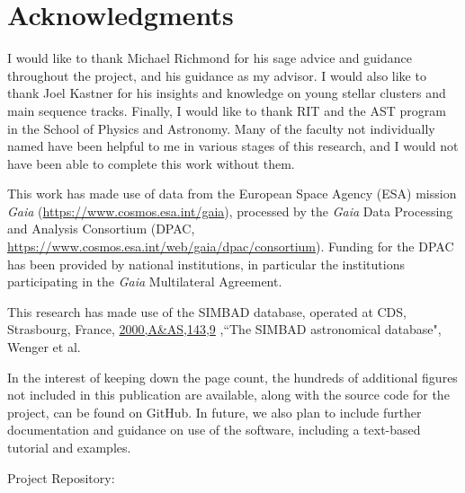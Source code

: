 \documentclass[onecolumn,table,xcdraw,super]{aastex631}
\begin{document}
\section{Acknowledgments}
I would like to thank Michael Richmond for his sage advice and guidance throughout the project, and his guidance as my advisor. I would also like to thank Joel Kastner for his insights and knowledge on young stellar clusters and main sequence tracks. Finally, I would like to thank RIT and the AST program in the School of Physics and Astronomy. Many of the faculty not individually named have been helpful to me in various stages of this research, and I would not have been able to complete this work without them.

This work has made use of data from the European Space Agency (ESA) mission
{\it Gaia} (\url{https://www.cosmos.esa.int/gaia}), processed by the {\it Gaia}
Data Processing and Analysis Consortium (DPAC,
\url{https://www.cosmos.esa.int/web/gaia/dpac/consortium}). Funding for the DPAC
has been provided by national institutions, in particular the institutions
participating in the {\it Gaia} Multilateral Agreement.

This research has made use of the SIMBAD database, operated at CDS, Strasbourg, France, \href{https://ui.adsabs.harvard.edu/abs/2000A\%26AS..143....9W}{2000,A\&AS,143,9} ,``The SIMBAD astronomical database", Wenger et al. 

{}
\nocite{*}


\newpage{}
\appendix{}
In the interest of keeping down the page count, the hundreds of additional figures not included in this publication are available, along with the source code for the project, can be found on GitHub. In future, we also plan to include further documentation and guidance on use of the software, including a text-based tutorial and examples. 
\vspace{0.3cm}

Project Repository: 
\end{document}
